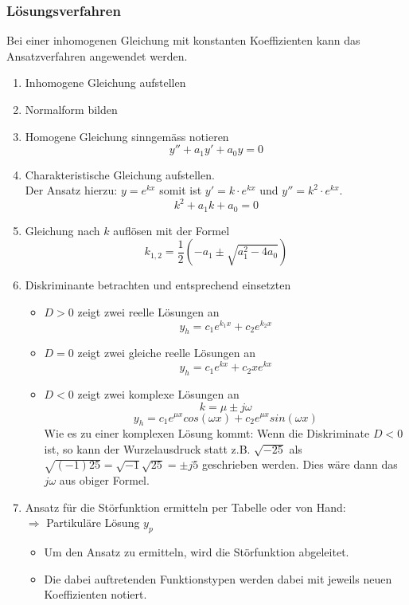 \subsubsection{Lösungsverfahren}
Bei einer inhomogenen Gleichung mit konstanten Koeffizienten kann das 
Ansatzverfahren angewendet werden. 
\begin{enumerate}
  \item Inhomogene Gleichung aufstellen
  \item Normalform bilden
  \item Homogene Gleichung sinngemäss notieren
	\[ y'' + a_1y' + a_0y = 0 \]
  \item Charakteristische Gleichung aufstellen.\\
	Der Ansatz hierzu: $y=e^{kx}$ somit ist $y'=k\cdot e^{kx}$
	und $y''=k^2 \cdot e^{kx}$.
	\[ k^2 + a_1k + a_0 = 0 \]
  \item Gleichung nach $k$ auflösen mit der Formel
	\[ k_{1,2} = \frac{1}{2}\left( -a_1 \pm \sqrt{a_1^2 - 4a_0} \right)  \]
  \item Diskriminante betrachten und entsprechend einsetzten
	\begin{itemize}
	  \item $D > 0$ zeigt zwei reelle Lösungen an\\
		\[ y_h=c_1e^{k_1x} + c_2e^{k_2x} \]
          \item $D = 0$ zeigt zwei gleiche reelle Lösungen an\\
		\[ y_h=c_1e^{kx} + c_2xe^{kx} \]
          \item $D < 0$ zeigt zwei komplexe Lösungen an\\
		\[ k=\mu \pm j \omega \]
		\[ y_h=c_1e^{\mu x} cos(\omega x) + c_2e^{\mu x} sin(\omega x) \]
		Wie es zu einer komplexen Lösung kommt: 
		Wenn die Diskriminate $D < 0$ ist, so kann der Wurzelausdruck
		statt z.B. $\sqrt{-25}$ als 
		$\sqrt{(-1)25}=\sqrt{-1}\sqrt{25}=\pm j5$ geschrieben werden.
		Dies wäre dann das $j\omega$ aus obiger Formel.
	\end{itemize}
  \item Ansatz für die Störfunktion ermitteln per Tabelle oder von Hand: \\
    $\Rightarrow$ Partikuläre Lösung $y_p$ 
    \begin{itemize}
      \item Um den Ansatz zu ermitteln, wird die Störfunktion 
            abgeleitet. 
      \item Die dabei auftretenden Funktionstypen werden dabei mit 
            jeweils neuen Koeffizienten notiert. 

\end{itemize}
\end{enumerate}
